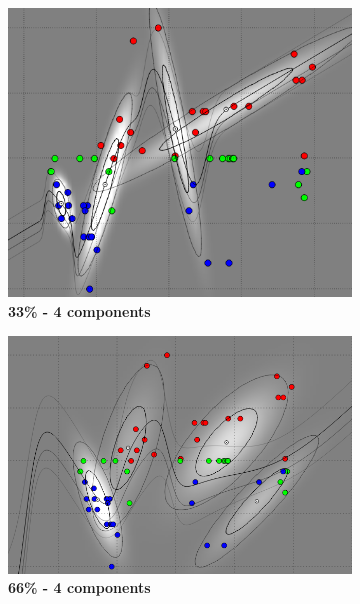 \begin{figure}[!ht]
\centering
\begin{subfigure}[h]{0.3\textwidth}
\centering
\includegraphics[height=0.11\textheight]{./regression/full_cov_kmeans_4_mixture_33train.png}
\caption{\bf 33\% - 4 components}
\end{subfigure}
\begin{subfigure}[h]{0.3\textwidth}
\centering
\includegraphics[height=0.11\textheight]{./regression/full_cov_kmeans_4_mixture_66train.png}
\caption{\bf 66\% - 4 components}
\end{subfigure}
\begin{subfigure}[h]{0.3\textwidth}
\centering

\end{subfigure}
\end{figure}
